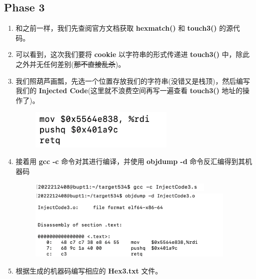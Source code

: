     \subsection{Phase 3}
        \begin{enumerate}
            \item 和之前一样，我们先查阅官方文档获取 \textbf{hexmatch()} 和 \textbf{touch3()} 的源代码。
                
            \item 可以看到，这次我们要将 \textbf{cookie} 以字符串的形式传递进 \textbf{touch3()} 中，除此之外并无任何差别(\sout{那不直接乱杀})。
            \item 我们照葫芦画瓢，先选一个位置存放我们的字符串(没错又是栈顶)，然后编写我们的 \textbf{Injected Code}(这里就不浪费空间再写一遍查看 \textbf{touch3()} 地址的操作了)。
                \begin{figure}[htbp]
                    \hspace*{1.5cm}
                    \includegraphics*[width = 7cm]{s3_0.png}
                \end{figure}
            \item 接着用 \textbf{gcc -c} 命令对其进行编译，并使用 \textbf{objdump -d} 命令反汇编得到其机器码
                \begin{figure}[htbp]
                    \hspace*{1.5cm}
                    \includegraphics*[width = 9cm]{s3_1.png} \\
                    \hspace*{1.5cm}
                    \includegraphics*[width = 10cm]{s3_2.png}
                \end{figure}
            \newpage
            \item 根据生成的机器码编写相应的 \textbf{Hex3.txt} 文件。

\end{enumerate}
